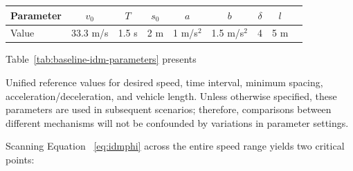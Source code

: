 \documentclass[11pt,a4paper,openany]{book}
\numberwithin{equation}{chapter}
\numberwithin{figure}{chapter}
\numberwithin{table}{chapter}
\newcommand{\tabletext}[2]{%
  \par\smallskip\noindent
  Table~\ref{#1} presents #2
\par\smallskip
}
\begin{document}
\begin{center}
\label{tab:baseline-idm-parameters}
\begin{tabular}{lcccccccc}
\toprule







Parameter




& $v_0$ & $T$ & $s_0$ & $a$ & $b$ & $\delta$ & $l$ \\
\midrule







Value




& 33.3 m/s & 1.5 s & 2 m & 1 m/s$^2$ & 1.5 m/s$^2$ & 4 & 5 m \\
\bottomrule
\end{tabular}
\end{center}
\tabletext{tab:baseline-idm-parameters}{




Unified reference values for desired speed, time interval, minimum spacing, acceleration/deceleration, and vehicle length. Unless otherwise specified, these parameters are used in subsequent scenarios; therefore, comparisons between different mechanisms will not be confounded by variations in parameter settings.
}










Scanning Equation ~\eqref{eq:idmphi} across the entire speed range yields two critical points:
\end{document}
